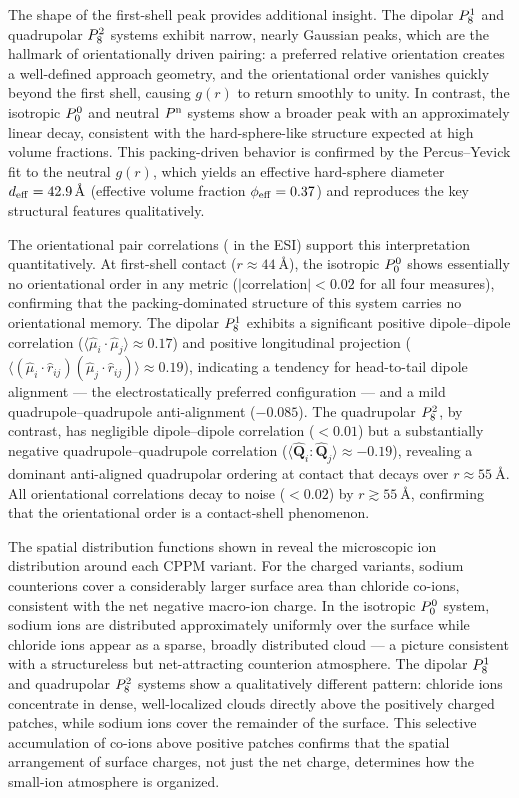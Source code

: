 \documentclass{article}
\begin{document}
The shape of the first-shell peak provides additional insight.
The dipolar $P^{1}_{8}$ and quadrupolar $P^{2}_{8}$ systems exhibit narrow, nearly Gaussian peaks, which are the hallmark of orientationally driven pairing: a preferred relative orientation creates a well-defined approach geometry, and the orientational order vanishes quickly beyond the first shell, causing $g(r)$ to return smoothly to unity.
In contrast, the isotropic $P^{0}_{0}$ and neutral $P^\mathrm{n}$ systems show a broader peak with an approximately linear decay, consistent with the hard-sphere-like structure expected at high volume fractions.
This packing-driven behavior is confirmed by the Percus--Yevick fit to the neutral $g(r)$, which yields an effective hard-sphere diameter $d_{\mathrm{eff}} = \qty{42.9}{\angstrom}$ (effective volume fraction $\phi_{\mathrm{eff}} = 0.37$) and reproduces the key structural features qualitatively.

The orientational pair correlations ( in the ESI) support this interpretation quantitatively.
At first-shell contact ($r \approx \qty{44}{\angstrom}$), the isotropic $P^{0}_{0}$ shows essentially no orientational order in any metric ($|\text{correlation}| < 0.02$ for all four measures), confirming that the packing-dominated structure of this system carries no orientational memory.
The dipolar $P^{1}_{8}$ exhibits a significant positive dipole--dipole correlation ($\langle\hat{\mu}_i\cdot\hat{\mu}_j\rangle \approx 0.17$) and positive longitudinal projection ($\langle(\hat{\mu}_i\cdot\hat{r}_{ij})(\hat{\mu}_j\cdot\hat{r}_{ij})\rangle \approx 0.19$), indicating a tendency for head-to-tail dipole alignment — the electrostatically preferred configuration — and a mild quadrupole--quadrupole anti-alignment ($-0.085$).
The quadrupolar $P^{2}_{8}$, by contrast, has negligible dipole--dipole correlation ($< 0.01$) but a substantially negative quadrupole--quadrupole correlation ($\langle\hat{\mathbf{Q}}_i{:}\hat{\mathbf{Q}}_j\rangle \approx -0.19$), revealing a dominant anti-aligned quadrupolar ordering at contact that decays over $r \approx \qty{55}{\angstrom}$.
All orientational correlations decay to noise ($< 0.02$) by $r \gtrsim \qty{55}{\angstrom}$, confirming that the orientational order is a contact-shell phenomenon.

The spatial distribution functions shown in  reveal the microscopic ion distribution around each CPPM variant.
For the charged variants, sodium counterions cover a considerably larger surface area than chloride co-ions, consistent with the net negative macro-ion charge.
In the isotropic $P^{0}_{0}$ system, sodium ions are distributed approximately uniformly over the surface while chloride ions appear as a sparse, broadly distributed cloud — a picture consistent with a structureless but net-attracting counterion atmosphere.
The dipolar $P^{1}_{8}$ and quadrupolar $P^{2}_{8}$ systems show a qualitatively different pattern: chloride ions concentrate in dense, well-localized clouds directly above the positively charged patches, while sodium ions cover the remainder of the surface.
This selective accumulation of co-ions above positive patches confirms that the spatial arrangement of surface charges, not just the net charge, determines how the small-ion atmosphere is organized.
\end{document}
